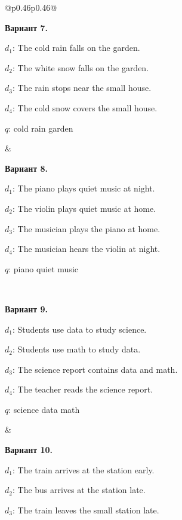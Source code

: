 \documentclass[12pt,a4paper]{article}
\begin{document}
{\begin{longtable}{@{}p{0.46\textwidth}p{0.46\textwidth}@{}}
\begin{minipage}[t]{\linewidth}
\textbf{Вариант 7.}\par\smallskip
$d_1$: The cold rain falls on the garden.\par\smallskip
$d_2$: The white snow falls on the garden.\par\smallskip
$d_3$: The rain stops near the small house.\par\smallskip
$d_4$: The cold snow covers the small house.\par\smallskip
$q$: cold rain garden\par
\end{minipage} &
\begin{minipage}[t]{\linewidth}\vspace{0pt}\raggedright\setlength{\parskip}{0pt}
\textbf{Вариант 8.}\par\smallskip
$d_1$: The piano plays quiet music at night.\par\smallskip
$d_2$: The violin plays quiet music at home.\par\smallskip
$d_3$: The musician plays the piano at home.\par\smallskip
$d_4$: The musician hears the violin at night.\par\smallskip
$q$: piano quiet music\par
\end{minipage}\\\noalign{\vskip 14pt}
\begin{minipage}[t]{\linewidth}\vspace{0pt}\raggedright\setlength{\parskip}{0pt}
\textbf{Вариант 9.}\par\smallskip
$d_1$: Students use data to study science.\par\smallskip
$d_2$: Students use math to study data.\par\smallskip
$d_3$: The science report contains data and math.\par\smallskip
$d_4$: The teacher reads the science report.\par\smallskip
$q$: science data math\par
\end{minipage} &
\begin{minipage}[t]{\linewidth}\vspace{0pt}\raggedright\setlength{\parskip}{0pt}
\textbf{Вариант 10.}\par\smallskip
$d_1$: The train arrives at the station early.\par\smallskip
$d_2$: The bus arrives at the station late.\par\smallskip
$d_3$: The train leaves the small station late.\par\smallskip

\end{minipage}
\end{longtable}}
\end{document}
